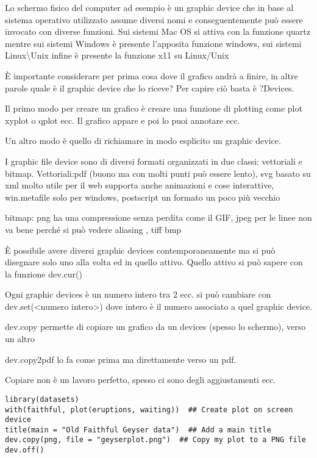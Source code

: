 Lo schermo fisico del computer ad esempio è un graphic device che in base al sistema operativo utilizzato assume diversi nomi e conseguentemente può essere invocato con diverse funzioni. Sui sistemi Mac OS si attiva con la funzione \textsf{quartz} mentre sui sistemi Windows è presente l'apposita funzione \textsf{windows}, sui sistemi Linux\textbackslash Unix infine è presente la funzione \textsf{x11} su Linux/Unix

È importante considerare per prima cosa dove il grafico andrà a finire, in altre parole quale è il graphic device che lo riceve? Per capire ciò basta è ?Devices.

Il primo modo per creare un grafico è creare una funzione di plotting come plot xyplot o qplot ecc. Il grafico appare e poi lo puoi annotare ecc.

Un altro modo è quello di richiamare in modo esplicito un graphic device.

I graphic file device sono di diversi formati organizzati in due classi: vettoriali e bitmap.
Vettoriali:pdf (buono ma con molti punti può essere lento), svg basato su xml molto utile per il web supporta anche animazioni e cose interattive, win.metafile solo per windows, postscript un formato un poco più vecchio


bitmap: png ha una compressione senza perdita come il GIF, jpeg per le linee non va bene perché si può vedere aliasing , tiff bmp


È possibile avere diversi graphic devices contemporaneamente ma si può disegnare solo uno alla volta ed in quello attivo. Quello attivo si può sapere con la funzione dev.cur()

Ogni graphic devices è un numero intero tra 2 ecc. si può cambiare con dev.set(<numero intero>) dove intero è il numero associato a quel graphic device.

dev.copy permette di copiare un grafico da un devices (spesso lo schermo), verso un altro

dev.copy2pdf lo fa come prima ma direttamente verso un pdf.

Copiare non è un lavoro perfetto, spesso ci sono degli aggiustamenti ecc.


\begin{lstlisting}
library(datasets)
with(faithful, plot(eruptions, waiting))  ## Create plot on screen device
title(main = "Old Faithful Geyser data")  ## Add a main title
dev.copy(png, file = "geyserplot.png")  ## Copy my plot to a PNG file
dev.off()
\end{lstlisting} 


